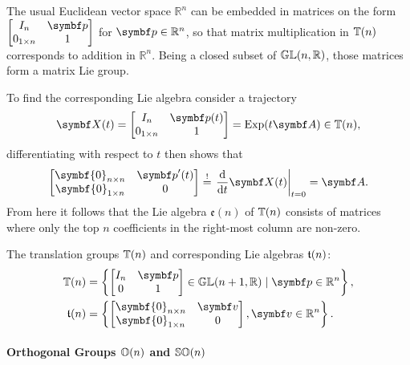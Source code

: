 The usual Euclidean vector space $\mathbb{R}^{n}$ can be embedded in matrices on the form $\begin{bmatrix} I_{n} & \bp \\ 0_{1 \times n} & 1 \end{bmatrix}$ for $\bp \in \mathbb{R}^{n}$, so that matrix multiplication in ${\mathbb{T}(n)}$ corresponds to addition in $\mathbb{R}^{n}$. Being a closed subset of ${\mathbb{GL}}(n, \mathbb{R})$, those matrices form a matrix Lie group.

To find the corresponding Lie algebra consider a trajectory
\begin{equation}
  \X(t) = \begin{bmatrix} I_{n} & \bp(t) \\ 0_{1 \times n} & 1 \end{bmatrix} = \Exp(t \A) \in \Tn,
\end{equation}
differentiating with respect to $t$ then shows that
\begin{equation}
  \begin{bmatrix}
    \symbf{0}_{n \times n} & \bp'(t) \\ \symbf{0}_{1 \times n} & 0
  \end{bmatrix} \overset{!}{=} \left.\frac{\mathrm{d}}{\mathrm{d}t} \X(t) \right|_{t = 0} = \A.
\end{equation}
From here it follows that the Lie algebra $\mathfrak{e}(n)$ of ${\mathbb{T}(n)}$ consists of matrices where only the top $n$ coefficients in the right-most column are non-zero.
\begin{important}
  The translation groups ${\mathbb{T}(n)}$ and corresponding Lie algebras ${\mathfrak{t}(n)}$:
  \begin{subequations}
    \begin{align}
      \Tn & = \left\{\begin{bmatrix} I_{n} & \bp \\ 0 & 1 \end{bmatrix} \in \GL(n+1, \mathbb{R}) \mid \bp \in \mathbb{R}^{n} \right\}, \\
      \tn & = \left\{ \begin{bmatrix} \symbf{0}_{n \times n} & \bv \\ \symbf{0}_{1 \times n} & 0\end{bmatrix}, \bv \in \mathbb{R}^n \right\}.
    \end{align}
  \end{subequations}
\end{important}

\paragraph{Orthogonal Groups ${\mathbb{O}(n)}$ and ${\mathbb{SO}(n)}$}

